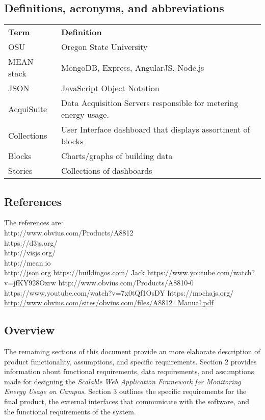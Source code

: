 \documentclass[onecolumn, draftclsnofoot,10pt, compsoc]{IEEEtran}
\begin{document}
    \subsection{Definitions, acronyms, and abbreviations} \label{definition}
	\begin{table}[h]
	\centering
	
	\begin{tabular}{ll}
	\textbf{Term} & \textbf{Definition} \\
	OSU & Oregon State University \\
	MEAN stack & MongoDB, Express, AngularJS, Node.js \\
	JSON & JavaScript Object Notation \\
	AcquiSuite & Data Acquisition Servers responsible for metering energy usage. \\
	Collections & User Interface dashboard that displays assortment of blocks \\
    Blocks & Charts/graphs of building data \\
    Stories & Collections of dashboards 
	\end{tabular}
	\end{table}
    \subsection{References} 
	The references are:\\
	http://www.obvius.com/Products/A8812 \\
    https://d3js.org/  \\
    http://visjs.org/  \\
    http://mean.io  \\
	http://json.org
	https://buildingos.com/
	Jack
    https://www.youtube.com/watch?v=jfKY928Ozrw
    http://www.obvius.com/Products/A8810-0
    https://www.youtube.com/watch?v=7x0tQf1OsDY
    https://mochajs.org/
    \url{http://www.obvius.com/sites/obvius.com/files/A8812_Manual.pdf}

    \subsection{Overview}
	The remaining sections of this document provide an more elaborate description of product functionality, assumptions, and specific requirements. Section 2 provides information about functional requirements, data requirements, and assumptions made for designing the \textit{Scalable Web Application Framework for Monitoring Energy Usage on Campus}. Section 3 outlines the specific requirements for the final product, the external interfaces that communicate with the software, and the functional requirements of the system.
	
\end{document}
